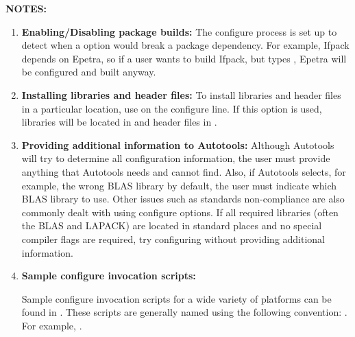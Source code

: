 {\bf NOTES:}
\begin{enumerate}
\item {\bf Enabling/Disabling package builds:}
The configure process is set up to detect when a
 option would break a package dependency.
For example, Ifpack depends on Epetra, so if a user wants to build Ifpack, but
types , Epetra will be configured and built
anyway.

\item {\bf Installing libraries and header files:}
To install libraries and header files in a particular location,
use  on the configure line.  If this option is
used, libraries will be located in  and header files in
.

\item {\bf Providing additional information to Autotools:}
Although Autotools will try to determine all configuration
information, the user must provide anything that Autotools needs and
cannot find.  Also, if Autotools selects, for example, the wrong
BLAS library by default, the user must indicate which BLAS library to use.
Other issues such as standards
non-compliance are also commonly dealt with using configure options.
If all required libraries (often
the BLAS and LAPACK) are located in standard places and no special
compiler flags are required, try configuring without
providing additional information.

\item {\bf Sample configure invocation scripts:}

\begin{minipage}[c]{\textwidth}
\begin{minipage}[l]{.6\textwidth}

Sample configure invocation scripts for a wide variety of platforms can be
found in .  These scripts are generally
named using the following convention: .
For example, .
\end{minipage}\hfill
{}
\end{minipage}


\end{enumerate}
